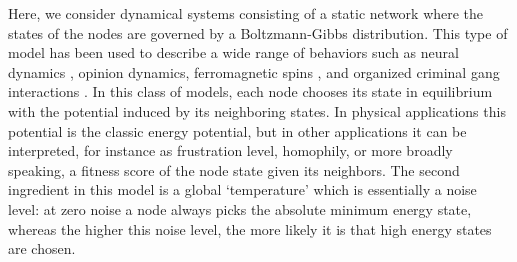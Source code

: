 \documentclass[a4paper, 11pt, twocolumn]{article}
\begin{document}
Here, we  consider dynamical systems consisting of a static network where the states of the nodes are governed by a Boltzmann-Gibbs
distribution. This type of model has been used to describe a wide range of
behaviors such as  neural dynamics \cite{cite_needed}, opinion
dynamics,  ferromagnetic  spins \cite{Glauber1963}, and  organized
criminal  gang  interactions  \cite{DOrsogna2015a}.
In this class of models, each node chooses its state in equilibrium with the potential induced by its neighboring states. In physical applications this potential is the classic energy potential, but in other applications it can be interpreted, for instance as frustration level, homophily, or more broadly speaking, a fitness score of the node state given its neighbors. The second ingredient in this model is a global `temperature' which is essentially a noise level: at zero noise a node always picks the absolute minimum energy state, whereas the higher this noise level, the more likely it is that high energy states are chosen.
\end{document}
